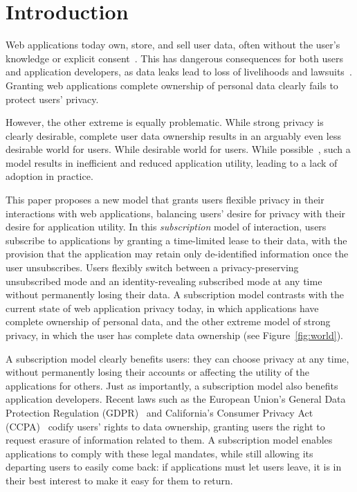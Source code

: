 \section{Introduction}

Web applications today own, store, and sell user data, often without the user's knowledge or
explicit consent~\cite{nytimes:fb, npr:data}. This has dangerous consequences for both users and
application developers, as data leaks lead to loss of livelihoods and
lawsuits~\cite{breach:amazon,breach:twitter, breach:fb, breach:marriott, breach:quora}. Granting web
applications complete ownership of personal data clearly fails to protect users' privacy. 

However, the other extreme is equally problematic.  While strong privacy is clearly desirable,
complete user data ownership results in an arguably even less desirable world for users. While
desirable world for users. While possible~\cite{amber, w5, blockstack, bstore}, such a model results
in inefficient and reduced application utility, leading to a lack of adoption in practice.  

This paper proposes a new model that grants users flexible privacy in their interactions with web
applications, balancing users' desire for privacy with their desire for application utility. In this
\emph{subscription} model of interaction, users subscribe to applications by granting a time-limited
lease to their data, with the provision that the application may retain only de-identified
information once the user unsubscribes. Users flexibly switch between a privacy-preserving
unsubscribed mode and an identity-revealing subscribed mode at any time without permanently losing
their data. 
A subscription model contrasts with the current state of web application privacy today,
in which applications have complete ownership of personal data, and the other extreme model of
strong privacy, in which the user has complete data ownership (see Figure~\ref{fig:world}). 

A subscription model clearly benefits users: they can choose privacy at any time, without permanently
losing their accounts or affecting the utility of the applications for others.
Just as importantly, a subscription model also benefits application developers. Recent laws
such as the European Union's General Data Protection Regulation (GDPR)~\cite{eu:gdpr} and
California's Consumer Privacy Act (CCPA)~\cite{ca:privacy-act} codify users' rights to data
ownership, granting users the right to request erasure of information related to them. A subscription 
model enables applications to comply with these legal mandates, while still allowing its departing users
to easily come back: if applications must let users leave, it is in their best interest to make it
easy for them to return.  

